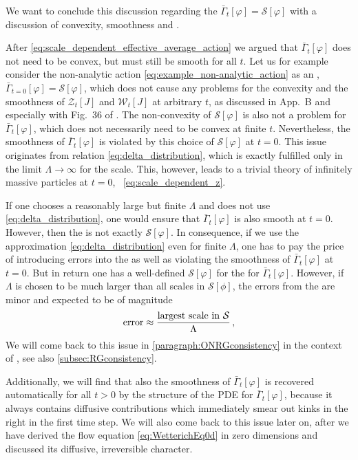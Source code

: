 We want to conclude this discussion regarding the \ic{} $\bar{\Gamma}_t [ \varphi ]=\mathcal{S} [ \varphi ]$ with a discussion of convexity, smoothness and \rgcy{}.

After \cref{eq:scale_dependent_effective_average_action} we argued that $\bar{\Gamma}_t [ \varphi ]$ does not need to be convex, but must still be smooth for all $t$.
Let us for example consider the non-analytic action \eqref{eq:example_non-analytic_action} as an \ic{}, $\bar{\Gamma}_{t = 0} [ \varphi ] = \mathcal{S} [ \varphi ]$, which does not cause any problems for the convexity and the smoothness of $\mathcal{Z}_t [ J ]$ and $\mathcal{W}_t [ J ]$ at arbitrary $t$, as discussed in App.~B and especially with Fig.~36 of .
The non-convexity of $\mathcal{S} [ \varphi ]$ is also not a problem for $\bar{\Gamma}_t [ \varphi ]$, which does not necessarily need to be convex at finite $t$.
Nevertheless, the smoothness of $\bar{\Gamma}_t [ \varphi ]$ is violated by this choice of $\mathcal{S} [ \varphi ]$ at $t = 0$.
This issue originates from relation \eqref{eq:delta_distribution}, which is exactly fulfilled only in the limit $\Lambda \rightarrow \infty$ for the \uv{} scale.
This, however, leads to a trivial theory of infinitely massive particles at $t = 0$, \cf{}\ \cref{eq:scale_dependent_z}.

If one chooses a reasonably large but finite $\Lambda$ and does not use \cref{eq:delta_distribution}, one would ensure that $\bar{\Gamma}_t [ \varphi ]$ is also smooth at $t = 0$.
However, then the \ic{} is not exactly $\mathcal{S} [ \varphi ]$.
In consequence, if we use the approximation \eqref{eq:delta_distribution} even for finite $\Lambda$, one has to pay the price of introducing errors into the \ic{} as well as violating the smoothness of $\bar{\Gamma}_t [ \varphi ]$ at $t = 0$.
But in return one has a well-defined \ic{} $\mathcal{S} [ \varphi ]$ for the \pde{} for $\bar{\Gamma}_t [ \varphi ]$.
However, if $\Lambda$ is chosen to be much larger than all scales in $\mathcal{S} [ \phi ]$, the errors from the \ic{} are minor and expected to be of magnitude
\begin{align}
	\mathrm{error} \approx \frac{\text{largest scale in\,\,} \mathcal{S}}{\Lambda} \, ,	\label{eq:error_scaling_uv_cutoff}
\end{align}
We will come back to this issue in \cref{paragraph:ONRGconsistency} in the context of \rgcy{}, see also \cref{subsec:RGconsistency}.

Additionally, we will find that also the smoothness of $\bar{\Gamma}_t [ \varphi ]$ is recovered automatically for all $t > 0$ by the structure of the PDE for $\bar{\Gamma}_t [ \varphi ]$, because it always contains diffusive contributions which immediately smear out kinks in the \ic{} right in the first time step.
We will also come back to this issue later on, after we have derived the flow equation \eqref{eq:WetterichEq0d} in zero dimensions and discussed its diffusive, irreversible character.

